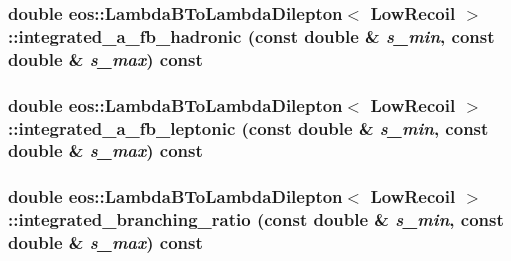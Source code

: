 \label{classeos_1_1LambdaBToLambdaDilepton_3_01LowRecoil_01_4_a2362225db8cae86eeb05394a5dd62e70}
\hypertarget{classeos_1_1LambdaBToLambdaDilepton_3_01LowRecoil_01_4_a926d1ccf5ef2271a2deda27008f1e278}{
\subsubsection[{integrated\_\-a\_\-fb\_\-hadronic}]{\setlength{\rightskip}{0pt plus 5cm}double eos::LambdaBToLambdaDilepton$<$ {\bf LowRecoil} $>$::integrated\_\-a\_\-fb\_\-hadronic (const double \& {\em s\_\-min}, \/  const double \& {\em s\_\-max}) const}}
\label{classeos_1_1LambdaBToLambdaDilepton_3_01LowRecoil_01_4_a926d1ccf5ef2271a2deda27008f1e278}
\hypertarget{classeos_1_1LambdaBToLambdaDilepton_3_01LowRecoil_01_4_a1db208cebab7f98fc22b69bf3f6ab36f}{
\subsubsection[{integrated\_\-a\_\-fb\_\-leptonic}]{\setlength{\rightskip}{0pt plus 5cm}double eos::LambdaBToLambdaDilepton$<$ {\bf LowRecoil} $>$::integrated\_\-a\_\-fb\_\-leptonic (const double \& {\em s\_\-min}, \/  const double \& {\em s\_\-max}) const}}
\label{classeos_1_1LambdaBToLambdaDilepton_3_01LowRecoil_01_4_a1db208cebab7f98fc22b69bf3f6ab36f}
\hypertarget{classeos_1_1LambdaBToLambdaDilepton_3_01LowRecoil_01_4_a70e787fa5e6a92c323644b5f0a11206f}{
\subsubsection[{integrated\_\-branching\_\-ratio}]{\setlength{\rightskip}{0pt plus 5cm}double eos::LambdaBToLambdaDilepton$<$ {\bf LowRecoil} $>$::integrated\_\-branching\_\-ratio (const double \& {\em s\_\-min}, \/  const double \& {\em s\_\-max}) const}}

